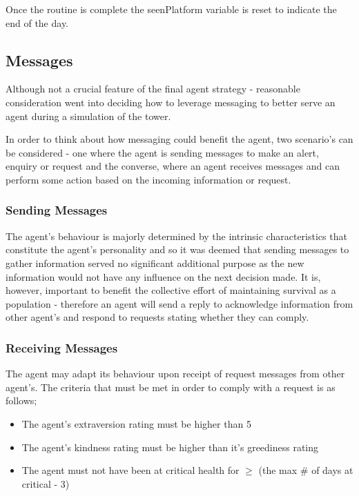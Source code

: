 Once the routine is complete the seenPlatform variable is reset to indicate the end of the day.

\subsection{Messages}
\label{subsec: Messages}
Although not a crucial feature of the final agent strategy - reasonable consideration went into deciding how to leverage messaging to better serve an agent during a simulation of the tower.

In order to think about how messaging could benefit the agent, two scenario’s can be considered - one where the agent is sending messages to make an alert, enquiry or request and the converse, where an agent receives messages and can perform some action based on the incoming information or request.
\subsubsection{Sending Messages}
\label{subsubsec: Sending Messages}
The agent’s behaviour is majorly determined by the intrinsic characteristics that constitute the agent’s personality and so it was deemed that sending messages to gather information served no significant additional purpose as the new information would not have any influence on the next decision made. It is, however, important to benefit the collective effort of maintaining survival as a population - therefore an agent will send a reply to acknowledge information from other agent’s and respond to requests stating whether they can comply.

\subsubsection{Receiving Messages}
\label{subsubsec: Receiving Messages}
The agent may adapt its behaviour upon receipt of request messages from other agent’s. The criteria that must be met in order to comply with a request is as follows; 

\begin{itemize}
  \item The agent’s extraversion rating must be higher than 5
  \item The agent’s kindness rating must be higher than it’s greediness rating
  \item The agent must not have been at critical health for \(\ge\) (the max \# of days at critical - 3)
\end{itemize}

